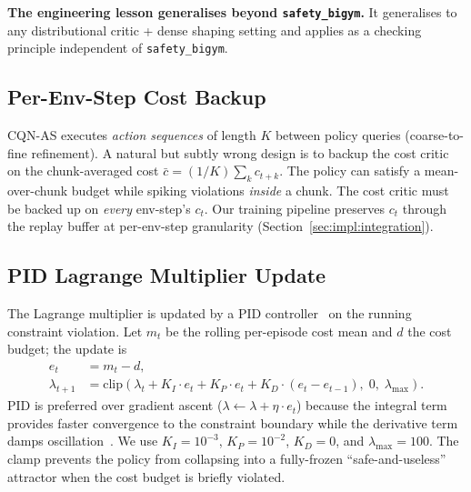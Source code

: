 \documentclass[11pt,a4paper]{report}
\newcommand{\sbigym}{\texttt{safety\_bigym}}
\newcommand{\cqnas}{CQN-AS}
\begin{document}
\textbf{The engineering lesson generalises beyond \sbigym{}.} It
generalises to any distributional critic + dense shaping setting
and applies as a checking principle independent of \sbigym{}.

\subsection{Per-Env-Step Cost Backup}
\label{sec:method:lagrangian:per-step}

\cqnas{} executes \emph{action sequences} of length $K$ between
policy queries (coarse-to-fine refinement). A natural but subtly
wrong design is to backup the cost critic on the chunk-averaged
cost $\bar{c} = (1/K) \sum_{k} c_{t+k}$. The policy can satisfy a
mean-over-chunk budget while spiking violations \emph{inside} a
chunk. The cost critic must be backed up on \emph{every} env-step's
$c_t$. Our training pipeline preserves $c_t$ through the replay
buffer at per-env-step granularity
(Section~\ref{sec:impl:integration}).

\subsection{PID Lagrange Multiplier Update}
\label{sec:method:lagrangian:pid}

The Lagrange multiplier is updated by a PID
controller~\cite{stooke2020pid} on the running constraint violation.
Let $m_t$ be the rolling per-episode cost mean and $d$ the cost
budget; the update is
\begin{align}
  e_t &= m_t - d, \\
  \lambda_{t+1} &= \mathrm{clip}\!\left(\lambda_t + K_I \cdot e_t
    + K_P \cdot e_t + K_D \cdot (e_t - e_{t-1}),
    \; 0,\; \lambda_{\max}\right).
  \label{eq:pid-lambda}
\end{align}
PID is preferred over gradient ascent
($\lambda \leftarrow \lambda + \eta \cdot e_t$) because the
integral term provides faster convergence to the constraint
boundary while the derivative term damps
oscillation~\cite{stooke2020pid}. We use $K_I = 10^{-3}$,
$K_P = 10^{-2}$, $K_D = 0$, and $\lambda_{\max} = 100$. The clamp
prevents the policy from collapsing into a fully-frozen
``safe-and-useless'' attractor when the cost budget is briefly
violated.
\end{document}
